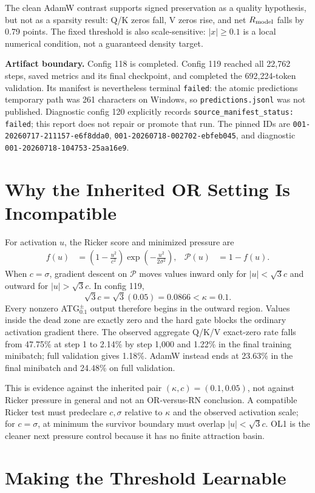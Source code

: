 \documentclass[10pt]{article}
\newcommand{\code}[1]{\texttt{#1}}
\newcommand{\pct}{\%}
\newcommand{\tightsection}[1]{\section{#1}\vspace{-0.35em}}
\newcommand{\Rmodel}{R_{\rm model}}
\begin{document}
The clean AdamW contrast supports signed preservation as a quality hypothesis, but not as a sparsity result: Q/K zeros fall, V zeros rise, and net $\Rmodel$ falls by 0.79 points. The fixed threshold is also scale-sensitive: $|x|\geq0.1$ is a local numerical condition, not a guaranteed density target.

\textbf{Artifact boundary.} Config 118 is completed. Config 119 reached all 22,762 steps, saved metrics and its final checkpoint, and completed the 692,224-token validation. Its manifest is nevertheless terminal \code{failed}: the atomic predictions temporary path was 261 characters on Windows, so \code{predictions.jsonl} was not published. Diagnostic config 120 explicitly records \code{source\_manifest\_status: failed}; this report does not repair or promote that run. The pinned IDs are \code{001-20260717-211157-e6f8dda0}, \code{001-20260718-002702-ebfeb045}, and diagnostic \code{001-20260718-104753-25aa16e9}.

\tightsection{Why the Inherited OR Setting Is Incompatible}

For activation $u$, the Ricker score and minimized pressure are
\begin{align*}
f(u)&=\left(1-\frac{u^2}{c^2}\right)\exp\!\left(-\frac{u^2}{2\sigma^2}\right),
&\mathcal{P}(u)&=1-f(u).
\end{align*}
When $c=\sigma$, gradient descent on $\mathcal{P}$ moves values inward only for $|u|<\sqrt{3}c$ and outward for $|u|>\sqrt{3}c$. In config 119,
\[
\sqrt{3}c=\sqrt{3}(0.05)=0.0866 < \kappa=0.1.
\]
Every nonzero ATG$^{\pm}_{0.1}$ output therefore begins in the outward region. Values inside the dead zone are exactly zero and the hard gate blocks the ordinary activation gradient there. The observed aggregate Q/K/V exact-zero rate falls from 47.75\pct{} at step 1 to 2.14\pct{} by step 1,000 and 1.22\pct{} in the final training minibatch; full validation gives 1.18\pct{}. AdamW instead ends at 23.63\pct{} in the final minibatch and 24.48\pct{} on full validation.

This is evidence against the inherited pair $(\kappa,c)=(0.1,0.05)$, not against Ricker pressure in general and not an OR-versus-RN conclusion. A compatible Ricker test must predeclare $c,\sigma$ relative to $\kappa$ and the observed activation scale; for $c=\sigma$, at minimum the survivor boundary must overlap $|u|<\sqrt{3}c$. OL1 is the cleaner next pressure control because it has no finite attraction basin.

\tightsection{Making the Threshold Learnable}
\end{document}
